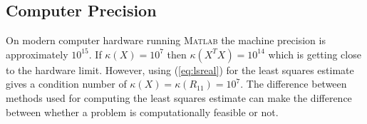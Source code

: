 \subsection{Computer Precision}
On modern computer hardware running \textsc{Matlab} the machine precision is approximately $10^{15}$.
If $\kappa(X)=10^7$ then $\kappa(X^T X)=10^{14}$ which is getting close to the hardware limit.
However, using (\ref{eq:lsreal}) for the least squares estimate gives a condition number of $\kappa(X)=\kappa(R_{11})=10^7$.
The difference between methods used for computing the least squares estimate can make the difference between whether a problem is computationally feasible or not.
